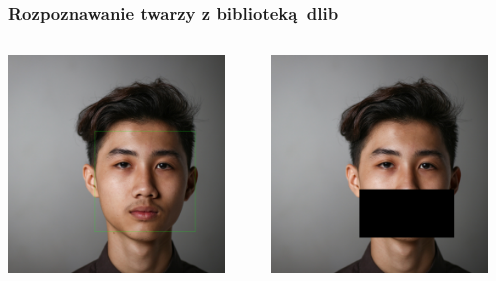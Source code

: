 \documentclass{beamer}
\begin{document}
            \begin{frame}
                \frametitle{Rozpoznawanie twarzy z biblioteką dlib}
                \begin{columns}
                    \begin{column}{0.5\textwidth}
                        \begin{center}
                            \includegraphics[width=0.9\textwidth]{pictures/face_detected}
                        \end{center}
                    \end{column}
                    \begin{column}{0.5\textwidth}
                        \begin{center}
                            \includegraphics[width=0.9\textwidth]{pictures/face_unsplash_mask}

\end{center}
\end{column}
\end{columns}
\end{frame}
\end{document}
